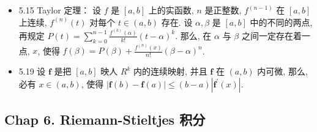 \begin{itemize}
\item 5.15 Taylor 定理： 设 $f$ 是 $[a, b]$ 上的实函数, $n$ 是正整数, $f^{(n-1)}$ 在 $[a, b]$ 上连续, $f^{(n)}(t)$ 对每个 $t \in(a, b)$ 存在. 设 $\alpha, \beta$ 是 $[a, b]$ 中的不同的两点, 再规定 $P(t)=\sum_{k=0}^{n-1} \frac{f^{(k)}(\alpha)}{k !}(t-\alpha)^{k}$. 那么, 在 $\alpha$ 与 $\beta$ 之间一定存在着一点, $x$, 使得 $f(\beta)=P(\beta)+\frac{f^{(n)}(x)}{n !}(\beta-\alpha)^{n}$.

\item 5.19 设 $\mathbf{f}$ 是把 $[a, b]$ 映人 $R^{k}$ 内的连续映射, 并且 $\mathbf{f}$ 在 $(a, b)$ 内可微, 那么, 必有 $x \in(a, b)$, 使得 $|\mathbf{f}(b)-\mathbf{f}(a)| \leqslant(b-a)\left|\mathbf{f}^{\prime}(x)\right|$.
\end{itemize}


\subsection{Chap 6. Riemann-Stieltjes 积分}
